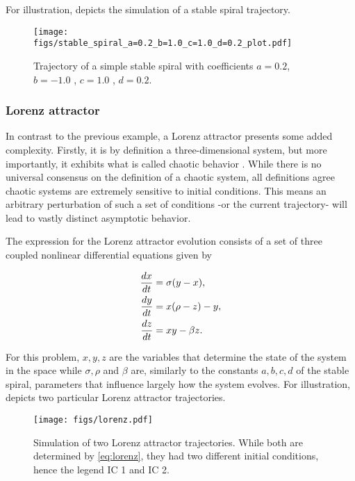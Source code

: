 For illustration,  depicts the simulation of a stable spiral trajectory.

\begin{figure}[H]
\texttt{[image: figs/stable\_spiral\_a=0.2\_b=1.0\_c=1.0\_d=0.2\_plot.pdf]}
    \caption{Trajectory of a simple stable spiral with coefficients $a = 0.2$, $b = -1.0$ , $c = 1.0$ , $d = 0.2$.}
    \label{fig:spiral}
\end{figure}


\subsubsection{Lorenz attractor}\label{sec:lorenz}

In contrast to the previous example, a Lorenz attractor presents some added complexity. Firstly, it is by definition a three-dimensional system, but more importantly, it exhibits what is called chaotic behavior \cite{hasselblatt2003first}. While there is no universal consensus on the definition of a chaotic system, all definitions agree chaotic systems are extremely sensitive to initial conditions. This means an arbitrary perturbation of such a set of conditions -or the current trajectory- will lead to vastly distinct asymptotic behavior.

The expression for the Lorenz attractor evolution consists of a set of three coupled nonlinear differential equations given by

\begin{align}
    \frac{dx}{dt} &= \sigma (y-x), \notag\\
    \frac{dy}{dt} &= x(\rho -z) - y, \notag\\
    \frac{dz}{dt} &= xy- \beta z.  
    \label{eq:lorenz}
\end{align}

For this problem, ${x,y,z}$ are the variables that determine the state of the system in the space while $\sigma, \rho$ and $\beta$ are, similarly to the constants $a,b,c,d$ of the stable spiral, parameters that influence largely how the system evolves. For illustration,  depicts two particular Lorenz attractor trajectories.

\begin{figure}[H]
\texttt{[image: figs/lorenz.pdf]}
    \caption{Simulation of two Lorenz attractor trajectories. While both are determined by \eqref{eq:lorenz}, they had two different initial conditions, hence the legend IC 1 and IC 2.}
    \label{fig:lorenz}
\end{figure}

